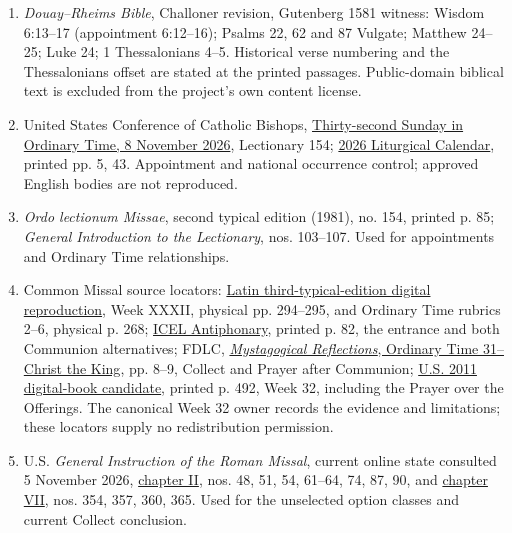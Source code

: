 \begin{enumerate}
\item \textit{Douay--Rheims Bible}, Challoner revision, Gutenberg 1581 witness: Wisdom 6:13--17 (appointment 6:12--16); Psalms 22, 62 and 87 Vulgate; Matthew 24--25; Luke 24; 1 Thessalonians 4--5. Historical verse numbering and the Thessalonians offset are stated at the printed passages. Public-domain biblical text is excluded from the project's own content license.
\item United States Conference of Catholic Bishops, \href{https://bible.usccb.org/bible/readings/110826.cfm}{Thirty-second Sunday in Ordinary Time, 8 November 2026}, Lectionary 154; \href{https://www.usccb.org/resources/2026cal.pdf}{2026 Liturgical Calendar}, printed pp. 5, 43. Appointment and national occurrence control; approved English bodies are not reproduced.
\item \textit{Ordo lectionum Missae}, second typical edition (1981), no. 154, printed p. 85; \textit{General Introduction to the Lectionary}, nos. 103--107. Used for appointments and Ordinary Time relationships.
\item Common Missal source locators: \href{https://media.musicasacra.com/books/latin_missal2002.pdf}{Latin third-typical-edition digital reproduction}, Week XXXII, physical pp. 294--295, and Ordinary Time rubrics 2--6, physical p. 268; \href{https://www.liturgyoffice.org.uk/Missal/Music/Antiphonary.pdf}{ICEL Antiphonary}, printed p. 82, the entrance and both Communion alternatives; FDLC, \href{https://fdlc.org/wp-content/uploads/2026/05/ComboColPaC78e_ORDINARY_31-CTK_SPI2016.pdf}{\textit{Mystagogical Reflections}, Ordinary Time 31--Christ the King}, pp. 8--9, Collect and Prayer after Communion; \href{https://archive.org/download/Roman-Missal-Third-Edition/Roman\%20Missal.pdf}{U.S. 2011 digital-book candidate}, printed p. 492, Week 32, including the Prayer over the Offerings. The canonical Week 32 owner records the evidence and limitations; these locators supply no redistribution permission.
\item U.S. \textit{General Instruction of the Roman Missal}, current online state consulted 5 November 2026, \href{https://www.usccb.org/prayer-and-worship/the-mass/general-instruction-of-the-roman-missal/girm-chapter-2}{chapter II}, nos. 48, 51, 54, 61--64, 74, 87, 90, and \href{https://www.usccb.org/prayer-and-worship/the-mass/general-instruction-of-the-roman-missal/girm-chapter-7}{chapter VII}, nos. 354, 357, 360, 365. Used for the unselected option classes and current Collect conclusion.

\end{enumerate}
